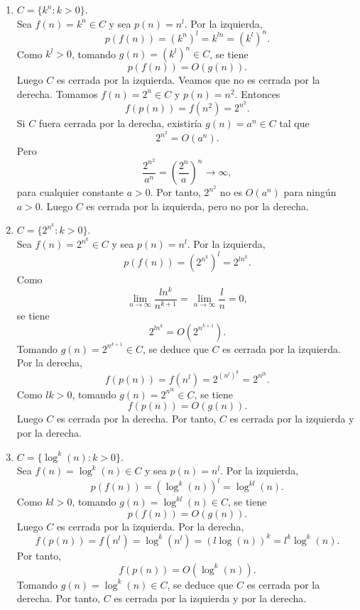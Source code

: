 \begin{ejercicio}
\begin{enumerate}
        \item[(c)] $C=\{k^n:k>0\}$. \\

            Sea $f(n)=k^n\in C$ y sea $p(n)=n^l$. Por la izquierda,
            $$
            p(f(n))=(k^n)^l=k^{ln}=(k^l)^n.
            $$
            Como $k^l>0$, tomando $g(n)=(k^l)^n\in C$, se tiene
            $$
            p(f(n))=O(g(n)).
            $$
            Luego $C$ es cerrada por la izquierda. Veamos que no es cerrada por 
            la derecha. Tomamos $f(n)=2^n\in C$ y $p(n)=n^2$. Entonces
            $$
            f(p(n))=f(n^2)=2^{n^2}.
            $$
            Si $C$ fuera cerrada por la derecha, existiría $g(n)=a^n\in C$ tal que
            $$
            2^{n^2}=O(a^n).
            $$
            Pero
            $$
            \frac{2^{n^2}}{a^n}=\left(\frac{2^n}{a}\right)^n \longrightarrow \infty,
            $$
            para cualquier constante $a>0$. Por tanto, $2^{n^2}$ no es $O(a^n)$ para ningún $a>0$.
            Luego $C$ es cerrada por la izquierda, pero no por la derecha.

        \item[(d)] $C=\{2^{n^k}:k>0\}$. \\

            Sea $f(n)=2^{n^k}\in C$ y sea $p(n)=n^l$. Por la izquierda,
            $$
            p(f(n))=(2^{n^k})^l=2^{l n^k}.
            $$
            Como
            $$
            \lim_{n \to \infty} \frac{l n^k}{n^{k+1}}
            =
            \lim_{n \to \infty} \frac{l}{n}
            =
            0,
            $$
            se tiene
            $$
            2^{l n^k}=O(2^{n^{k+1}}).
            $$
            Tomando $g(n)=2^{n^{k+1}}\in C$, se deduce que $C$ es cerrada por la izquierda.
            Por la derecha,
            $$
            f(p(n))=f(n^l)=2^{(n^l)^k}=2^{n^{lk}}.
            $$
            Como $lk>0$, tomando $g(n)=2^{n^{lk}}\in C$, se tiene
            $$
            f(p(n))=O(g(n)).
            $$
            Luego $C$ es cerrada por la derecha.
            Por tanto, $C$ es cerrada por la izquierda y por la derecha.

        \item[(e)] $C=\{\log^k(n):k>0\}$. \\

            Sea $f(n)=\log^k(n)\in C$ y sea $p(n)=n^l$. Por la izquierda,
            $$
            p(f(n))=(\log^k(n))^l=\log^{kl}(n).
            $$
            Como $kl>0$, tomando $g(n)=\log^{kl}(n)\in C$, se tiene
            $$
            p(f(n))=O(g(n)).
            $$
            Luego $C$ es cerrada por la izquierda. Por la derecha,
            $$
            f(p(n))=f(n^l)=\log^k(n^l)=(l\log(n))^k=l^k\log^k(n).
            $$
            Por tanto,
            $$
            f(p(n))=O(\log^k(n)).
            $$
            Tomando $g(n)=\log^k(n)\in C$, se deduce que $C$ es cerrada por la derecha.
            Por tanto, $C$ es cerrada por la izquierda y por la derecha.


\end{enumerate}
\end{ejercicio}
